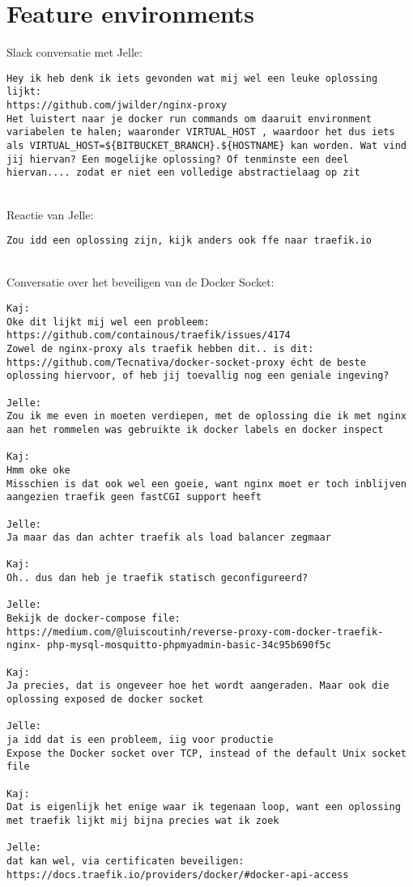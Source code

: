 \section{Feature environments}
\label{FeedbackFeatureEnvironments}

Slack conversatie met Jelle:
\begin{verbatim}
Hey ik heb denk ik iets gevonden wat mij wel een leuke oplossing lijkt:
https://github.com/jwilder/nginx-proxy
Het luistert naar je docker run commands om daaruit environment variabelen te halen; waaronder VIRTUAL_HOST , waardoor het dus iets als VIRTUAL_HOST=${BITBUCKET_BRANCH}.${HOSTNAME} kan worden. Wat vind jij hiervan? Een mogelijke oplossing? Of tenminste een deel hiervan.... zodat er niet een volledige abstractielaag op zit
\end{verbatim}
\\Reactie van Jelle:
\begin{verbatim}
Zou idd een oplossing zijn, kijk anders ook ffe naar traefik.io
\end{verbatim}
\\Conversatie over het beveiligen van de Docker Socket:
\begin{verbatim}
Kaj: 
Oke dit lijkt mij wel een probleem:
https://github.com/containous/traefik/issues/4174
Zowel de nginx-proxy als traefik hebben dit.. is dit: https://github.com/Tecnativa/docker-socket-proxy écht de beste oplossing hiervoor, of heb jij toevallig nog een geniale ingeving?

Jelle:
Zou ik me even in moeten verdiepen, met de oplossing die ik met nginx aan het rommelen was gebruikte ik docker labels en docker inspect

Kaj:
Hmm oke oke
Misschien is dat ook wel een goeie, want nginx moet er toch inblijven aangezien traefik geen fastCGI support heeft

Jelle:
Ja maar das dan achter traefik als load balancer zegmaar

Kaj:
Oh.. dus dan heb je traefik statisch geconfigureerd?

Jelle:
Bekijk de docker-compose file: https://medium.com/@luiscoutinh/reverse-proxy-com-docker-traefik-nginx- php-mysql-mosquitto-phpmyadmin-basic-34c95b690f5c

Kaj:
Ja precies, dat is ongeveer hoe het wordt aangeraden. Maar ook die oplossing exposed de docker socket

Jelle:
ja idd dat is een probleem, iig voor productie
Expose the Docker socket over TCP, instead of the default Unix socket file

Kaj:
Dat is eigenlijk het enige waar ik tegenaan loop, want een oplossing met traefik lijkt mij bijna precies wat ik zoek

Jelle:
dat kan wel, via certificaten beveiligen:
https://docs.traefik.io/providers/docker/#docker-api-access

\end{verbatim}
